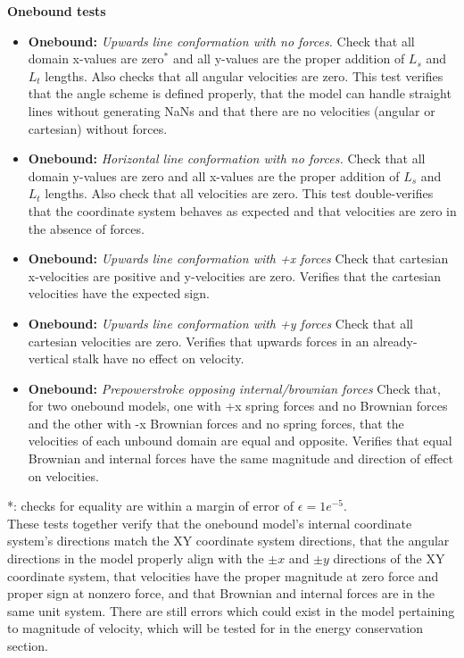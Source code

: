 \documentclass[10pt]{article} %
\begin{document}
\textbf{Onebound tests}
\begin{itemize}
\item \textbf{Onebound:} \textit{Upwards line conformation with no forces.} Check that all domain x-values are zero$^*$ and all y-values are the proper addition of $L_s$ and $L_t$ lengths. Also checks that all angular velocities are zero. This test verifies that the angle scheme is defined properly, that the model can handle straight lines without generating NaNs and that there are no velocities (angular or cartesian) without forces.
\item \textbf{Onebound:} \textit{Horizontal line conformation with no forces.} Check that all domain y-values are zero and all x-values are the proper addition of $L_s$ and $L_t$ lengths. Also check that all velocities are zero. This test double-verifies that the coordinate system behaves as expected and that velocities are zero in the absence of forces.
\item \textbf{Onebound:} \textit{Upwards line conformation with +x forces} Check that cartesian x-velocities are positive and y-velocities are zero. Verifies that the cartesian velocities have the expected sign.
\item \textbf{Onebound:} \textit{Upwards line conformation with +y forces} Check that all cartesian velocities are zero. Verifies that upwards forces in an already-vertical stalk have no effect on velocity.
  \item \textbf{Onebound:} \textit{Prepowerstroke opposing internal/brownian forces} Check that, for two onebound models, one with +x spring forces and no Brownian forces and the other with -x Brownian forces and no spring forces, that the velocities of each unbound domain are equal and opposite. Verifies that equal Brownian and internal forces have the same magnitude and direction of effect on velocities.
\end{itemize}
*: checks for equality are within a margin of error of $\epsilon = 1e^{-5}$.\\

These tests together verify that the onebound model's internal coordinate system's directions match the XY coordinate system directions, that the angular directions in the model properly align with the $\pm x$ and $\pm y$ directions of the XY coordinate system, that velocities have the proper magnitude at zero force and proper sign at nonzero force, and that Brownian and internal forces are in the same unit system. There are still errors which could exist in the model pertaining to magnitude of velocity, which will be tested for in the energy conservation section.\\
\end{document}
